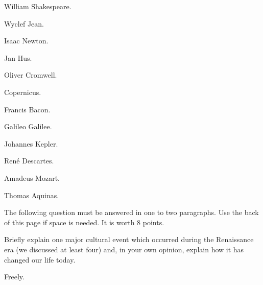 \documentclass[12pt]{examdesign}
\begin{document}
\begin{truefalse}[title={People}]
	\begin{question}
		 William Shakespeare.
	\end{question}

	\begin{question}
		 Wyclef Jean.
	\end{question}

	\begin{question}
		 Isaac Newton.
	\end{question}

	\begin{question}
		 Jan Hus.
	\end{question}

	\begin{question}
		 Oliver Cromwell.
	\end{question}

	\begin{question}
		 Copernicus.
	\end{question}

	\begin{question}
		 Francis Bacon.
	\end{question}

	\begin{question}
		 Galileo Galilee.
	\end{question}

	\begin{question}
		 Johannes Kepler.
	\end{question}

	\begin{question}
		 René Descartes.
	\end{question}

	\begin{question}
		 Amadeus Mozart.
	\end{question}

	\begin{question}
		 Thomas Aquinas.
	\end{question}
\end{truefalse}

\pagebreak
\begin{shortanswer}[title={Short Essay}]
	The following question must be answered in one to two paragraphs. Use the back of this page if space is needed. It is worth 8 points.

	\begin{question}
		Briefly explain one major cultural event which occurred during the Renaissance era (we discussed at least four) and, in your own opinion, explain how it has changed our life today.
		\examvspace{5 in}
		\begin{answer}
			Freely.
		\end{answer}
	\end{question}
\end{shortanswer}
\end{document}
